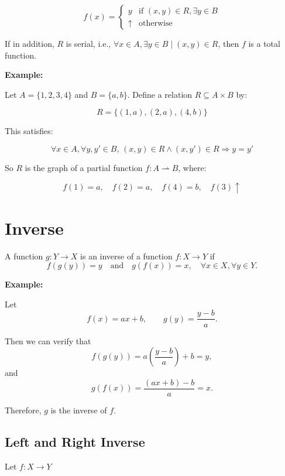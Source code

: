 \documentclass[12pt,a4paper,openany]{article}
\begin{document}
\[f(x) = \begin{cases} y & \text{if } (x, y) \in R, \exists y \in B \\ \uparrow & \text{otherwise} \end{cases}\]

If in addition, $R$ is serial, i.e., $\forall x \in A, \exists y \in B \mid (x, y) \in R$, then $f$ is a total function.

\textbf{Example:}

Let $A = \{1, 2, 3, 4\}$ and $B = \{a, b\}$. Define a relation $R \subseteq A \times B$ by:

\[R = \{(1, a), (2, a), (4, b)\}\]

This satisfies:

\[\forall x \in A, \forall y, y' \in B, \, (x, y) \in R \land (x, y') \in R \Rightarrow y = y'\]

So $R$ is the graph of a partial function $f : A \rightharpoonup B$, where:

\[f(1) = a,\quad f(2) = a,\quad f(4) = b,\quad f(3) \uparrow\]

\section{Inverse}

A function $g : Y \to X$ is an inverse of a function $f : X \to Y$ if
\[
f(g(y)) = y \quad \text{and} \quad g(f(x)) = x, \quad \forall x \in X, \forall y \in Y.
\]

\textbf{Example:}

Let
\[
f(x) = a x + b, \qquad g(y) = \frac{y - b}{a}.
\]

Then we can verify that
\[
f(g(y)) = a \left( \frac{y - b}{a} \right) + b = y,
\]
and
\[
g(f(x)) = \frac{(a x + b) - b}{a} = x.
\]

Therefore, $g$ is the inverse of $f$.

\subsection{Left and Right Inverse}

Let $f : X \to Y$
\end{document}
